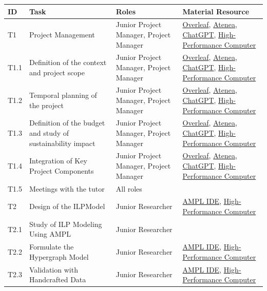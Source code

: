 \begin{landscape}
    \begin{table}[!ht]
    \centering
    \begin{tabular}{|l|p{5cm}|l|l|}
        \hline
        \rowcolor{black!25}
        ID & Task & Roles  & Material Resource \\ \hline
        \rowcolor{black!15}
        T1 & Project Management & Junior Project Manager, Project Manager & \hyperlink{ht:overleaf}{Overleaf}, \hyperlink{ht:atenea}{Atenea}, \hyperlink{ht:chatgpt}{ChatGPT}, \hyperlink{ht:hpc}{High-Performance Computer} \\ \hline
        T1.1 & Definition of the context and project scope & Junior Project Manager, Project Manager & \hyperlink{ht:overleaf}{Overleaf}, \hyperlink{ht:atenea}{Atenea}, \hyperlink{ht:chatgpt}{ChatGPT}, \hyperlink{ht:hpc}{High-Performance Computer} \\ \hline
        T1.2 & Temporal planning of the project & Junior Project Manager, Project Manager & \hyperlink{ht:overleaf}{Overleaf}, \hyperlink{ht:atenea}{Atenea}, \hyperlink{ht:chatgpt}{ChatGPT}, \hyperlink{ht:hpc}{High-Performance Computer} \\ \hline
        T1.3 & Definition of the budget and study of sustainability impact & Junior Project Manager, Project Manager & \hyperlink{ht:overleaf}{Overleaf}, \hyperlink{ht:atenea}{Atenea}, \hyperlink{ht:chatgpt}{ChatGPT}, \hyperlink{ht:hpc}{High-Performance Computer} \\ \hline
        T1.4 & Integration of Key Project Components & Junior Project Manager, Project Manager & \hyperlink{ht:overleaf}{Overleaf}, \hyperlink{ht:atenea}{Atenea}, \hyperlink{ht:chatgpt}{ChatGPT}, \hyperlink{ht:hpc}{High-Performance Computer} \\ \hline
        T1.5 & Meetings with the tutor & All roles & ~ \\ \hline
        \rowcolor{black!15}
        T2 & Design of the ILPModel & Junior Researcher & \hyperlink{ht:amplide}{AMPL IDE}, \hyperlink{ht:hpc}{High-Performance Computer} \\ \hline
        T2.1 & Study of ILP Modeling Using AMPL & Junior Researcher & ~ \\ \hline
        T2.2 & Formulate the Hypergraph Model & Junior Researcher & \hyperlink{ht:amplide}{AMPL IDE}, \hyperlink{ht:hpc}{High-Performance Computer} \\ \hline
        T2.3 & Validation with Handcrafted Data & Junior Researcher & \hyperlink{ht:amplide}{AMPL IDE}, \hyperlink{ht:hpc}{High-Performance Computer} \\ \hline

\end{tabular}
\end{table}
\end{landscape}
